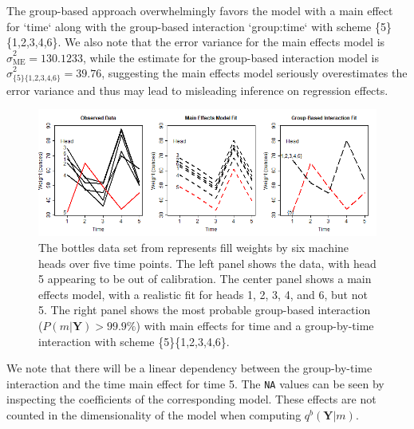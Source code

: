 The group-based approach overwhelmingly favors the model with a main effect for `time` along with the group-based interaction `group:time` with scheme \{5\}\{1,2,3,4,6\}. We also note that the error variance for the main effects model is $\hat{\sigma}^2_{\text{ME}}=130.1233$, while the estimate for the group-based interaction model is $\hat{\sigma}^2_{\text{\{5\}\{1,2,3,4,6\}}}=39.76$, suggesting the main effects model seriously overestimates the error variance and thus may lead to misleading inference on regression effects. 

\begin{figure}[htp!]
  \centering
  \includegraphics[width=5in]{figures/bottles.png}
  \caption{The bottles data set from \citet{bottles} represents fill weights by six machine heads over five time points. The left panel shows the data, with head 5 appearing to be out of calibration. The center panel shows a main effects model, with a realistic fit for heads 1, 2, 3, 4, and 6, but not 5. The right panel shows the most probable group-based interaction ($P(m|\boldsymbol{Y})> 99.9\%$) with main effects for time and a group-by-time interaction with scheme \{5\}\{1,2,3,4,6\}.}
  \label{figure:bottles}
\end{figure}

We note that there will be a linear dependency between the group-by-time interaction and the time main effect for time 5. The \texttt{NA} values can be seen by inspecting the coefficients of the corresponding model. These effects are not counted in the dimensionality of the model when computing $q^b(\boldsymbol{Y}|m)$. 


